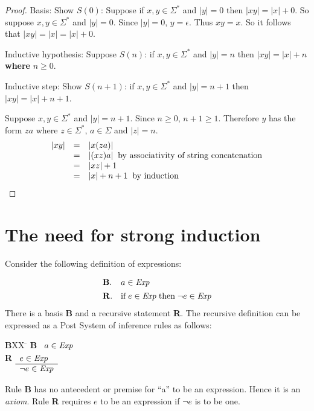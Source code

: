 \documentclass[12pt]{article}
\newcommand{\id}[1]{\mbox{\it #1\/}}
\newcommand{\rid}[1]{\mbox{\rm #1}}
\begin{document}
\begin{proof}
\noindent Basis: Show $S(0)$: Suppose if $x,y\in\Sigma^*$ and $|y|=0$ then $|xy|=|x|+0$.
So suppose $x,y\in\Sigma^*$ and $|y|=0$.
Since $|y|=0$, $y=\epsilon$.  Thus $xy=x$. So it follows that $|xy|=|x|=|x| + 0$.

\vspace{0.5em}
\noindent Inductive hypothesis: Suppose $S(n)$: if $x,y\in\Sigma^*$ and $|y|=n$ then $|xy| = |x| + n$ {\bf where} $n\geq 0$.

\vspace{0.5em}
\noindent Inductive step: Show $S(n+1)$: if $x,y\in\Sigma^*$ and $|y|=n+1$ then $|xy| = |x| + n+1$.

\vspace{1em}
\noindent Suppose $x,y\in\Sigma^*$ and $|y|=n+1$.
Since $n\geq 0$, $n+1\geq 1$.
Therefore $y$ has the form $za$ where $z\in\Sigma^*$, $a\in\Sigma$ and $|z|=n$.
\[\begin{array}{lll}
|xy| & = & |x(za)| \\
 & = & |(xz)a| \;\;\rid{by associativity of string concatenation} \\
 & = & |xz| + 1 \\
 & = & |x|+n + 1 \;\;\rid{by induction}
\end{array}
\]
\end{proof}

\section{The need for strong induction}

Consider the following definition of expressions:

\[\begin{array}{ll}
{\bf B}. & a\in\id{Exp} \\[1ex]
{\bf R}. & \rid{if}\;e\in\id{Exp}\;\rid{then}\; \neg e\in\id{Exp}
\end{array}
\]
There is a basis {\bf B} and a recursive statement {\bf R}.
The recursive definition can be expressed as a Post System of inference rules as follows:
\begin{tabbing}
{\bf B}XX \=  \kill
{\bf B} \>
	\(\begin{array}[t]{l}
	a\in\id{Exp} 
	\end{array}\) \\[2ex]
{\bf R} \>
	\(\begin{array}[t]{l}
	e\in\id{Exp} \\
	\hline
	\neg e\in\id{Exp}
	\end{array}\) %
\end{tabbing}
Rule {\bf B} has no antecedent or premise for
``a'' to be an expression.
Hence it is an {\em axiom\/}.
Rule {\bf R} requires $e$ to be an expression if $\neg e$ is to be one.
\end{document}
